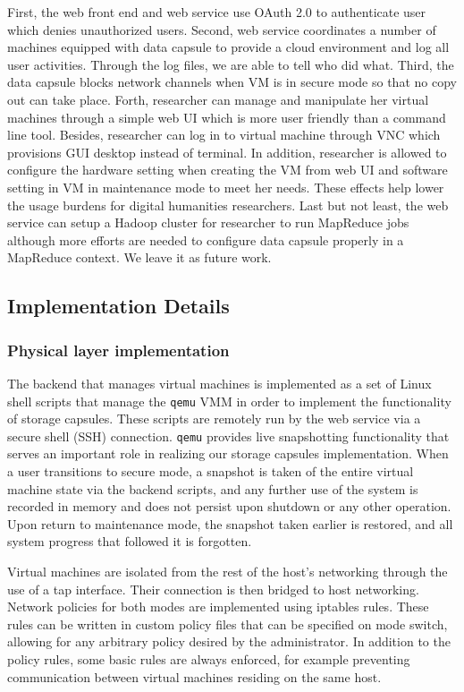 \documentclass{acm_proc_article-sp}
\begin{document}
First, the web front end and web service use OAuth 2.0 to authenticate user which denies unauthorized users. Second, web service coordinates a number of machines equipped with data capsule to provide a cloud environment and log all user activities. Through the log files, we are able to tell who did what. Third, the data capsule blocks network channels when VM is in secure mode so that no copy out can take place. Forth, researcher can manage and manipulate her virtual machines through a simple web UI which is more user friendly than a command line tool. Besides, researcher can log in to virtual machine through VNC which provisions GUI desktop instead of terminal. In addition, researcher is allowed to configure the hardware setting when creating the VM from web UI and software setting in VM in maintenance mode to meet her needs. These effects help lower the usage burdens for digital humanities researchers. Last but not least, the web service can setup a Hadoop cluster for researcher to run MapReduce jobs although more efforts are needed to configure data capsule properly in a MapReduce context. We leave it as future work.

\subsection{Implementation Details}

\subsubsection{Physical layer implementation}

The backend that manages virtual machines is implemented as a set of Linux
shell scripts that manage the \texttt{qemu} VMM in order to implement the
functionality of storage capsules.  These scripts are remotely run by the web
service via a secure shell (SSH) connection.  \texttt{qemu} provides live
snapshotting functionality that serves an important role in realizing our
storage capsules implementation.  When a user transitions to secure mode, a
snapshot is taken of the entire virtual machine state via the backend scripts,
and any further use of the system is recorded in memory and does not persist
upon shutdown or any other operation.  Upon return to maintenance mode, the
snapshot taken earlier is restored, and all system progress that followed it is
forgotten.

Virtual machines are isolated from the rest of the host's networking through the
use of a tap interface.  Their connection is then bridged to host networking.
Network policies for both modes are implemented using iptables rules.  These
rules can be written in custom policy files that can be specified on mode
switch, allowing for any arbitrary policy desired by the administrator.  In
addition to the policy rules, some basic rules are always enforced, for example
preventing communication between virtual machines residing on the same host.
\end{document}
